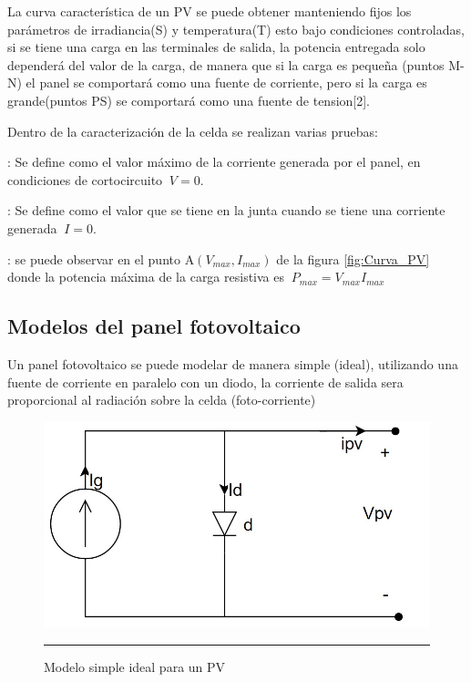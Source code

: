 La curva característica de un PV  se puede obtener manteniendo fijos los parámetros de irradiancia(S) y temperatura(T) esto bajo condiciones controladas, si se tiene una carga en las terminales de salida, la potencia entregada solo dependerá del valor de la carga, de manera que si la carga es pequeña (puntos M-N) el panel se comportará como una fuente de corriente, pero si la carga es grande(puntos PS) se comportará como una fuente de tension[2]. 

Dentro de la caracterización de la celda se realizan varias pruebas: 

\begin{compactitem}

\item {}: Se define como el valor máximo de la corriente generada por el panel, en condiciones de cortocircuito $\ V=0$.


\item {}: Se define como el valor que se tiene en la junta  cuando se tiene una corriente generada $\ I=0$.

\item  {}: se puede observar en el punto A$\left(V_{max},I_{max} \right)$ de la figura \ref{fig:Curva_PV} donde la potencia máxima de la carga resistiva es $\ P_{max} = V_{max}I_{max}$


\end{compactitem}



\subsection{Modelos del panel fotovoltaico}

Un panel fotovoltaico se puede modelar de manera simple (ideal), utilizando una fuente de corriente en paralelo con un diodo, la corriente de salida sera proporcional al radiación sobre la celda (foto-corriente)

\begin{figure}[H]
  \centering
    \includegraphics[scale=0.5]{./M1PV.jpg}
    \rule{35em}{0.5pt}
  \caption[Modelo simple ideal para un PV]{ Modelo simple ideal para un PV}
  \label{fig:Modelo1_PV}
\end{figure}

